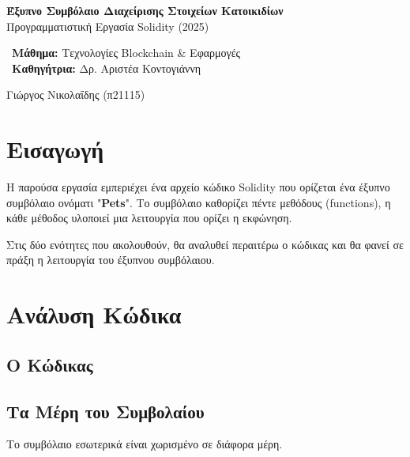 \documentclass[12pt,a4paper]{article}
\begin{document}


\begin{titlepage}
    \centering
    \vspace*{2cm}
    
    {\huge\textbf{Έξυπνο Συμβόλαιο Διαχείρισης Στοιχείων Κατοικιδίων}}\\
    \vspace{2cm}
    {\large Προγραμματιστική Εργασία Solidity (2025)}
    \vspace{3cm}
    
    {\large\ \textbf{Μάθημα:} Τεχνολογίες Blockchain \& Εφαρμογές}\\
    {\large\ \textbf{Καθηγήτρια:} Δρ. Αριστέα Κοντογιάννη}\\
    \vspace{2cm}
    
    {\large Γιώργος Νικολαΐδης (π21115)}\\
\end{titlepage}

\tableofcontents
\newpage

\section{Εισαγωγή}
Η παρούσα εργασία εμπεριέχει ένα αρχείο κώδικο Solidity που ορίζεται ένα έξυπνο συμβόλαιο ονόματι "\textbf{Pets}". Το συμβόλαιο καθορίζει πέντε μεθόδους (functions), η κάθε μέθοδος υλοποιεί μια λειτουργία που ορίζει η εκφώνηση. 

Στις δύο ενότητες που ακολουθούν, θα αναλυθεί περαιτέρω ο κώδικας και θα φανεί σε πράξη η λειτουργία του έξυπνου συμβόλαιου.

\newpage

\section{Ανάλυση Κώδικα}

\subsection{Ο Κώδικας}


\subsection{Τα Μέρη του Συμβολαίου}
Το συμβόλαιο εσωτερικά είναι χωρισμένο σε διάφορα μέρη.
\end{document}
